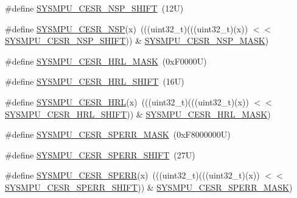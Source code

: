 \begin{DoxyCompactItemize}
\#define \mbox{\hyperlink{group___s_y_s_m_p_u___register___masks_ga1579b603c3fe8c7c00502b776915dd52}{S\+Y\+S\+M\+P\+U\+\_\+\+C\+E\+S\+R\+\_\+\+N\+S\+P\+\_\+\+S\+H\+I\+FT}}~(12\+U)
\item 
\#define \mbox{\hyperlink{group___s_y_s_m_p_u___register___masks_ga376ec3fe851f0d8e69076e1a39fddc59}{S\+Y\+S\+M\+P\+U\+\_\+\+C\+E\+S\+R\+\_\+\+N\+SP}}(x)~(((uint32\+\_\+t)(((uint32\+\_\+t)(x)) $<$$<$ \mbox{\hyperlink{group___s_y_s_m_p_u___register___masks_ga1579b603c3fe8c7c00502b776915dd52}{S\+Y\+S\+M\+P\+U\+\_\+\+C\+E\+S\+R\+\_\+\+N\+S\+P\+\_\+\+S\+H\+I\+FT}})) \& \mbox{\hyperlink{group___s_y_s_m_p_u___register___masks_gac48f7411bae4206428ca7a27f95fe89b}{S\+Y\+S\+M\+P\+U\+\_\+\+C\+E\+S\+R\+\_\+\+N\+S\+P\+\_\+\+M\+A\+SK}})
\item 
\#define \mbox{\hyperlink{group___s_y_s_m_p_u___register___masks_ga82af5460e500bd2c3b09cb1cfbbaf5d2}{S\+Y\+S\+M\+P\+U\+\_\+\+C\+E\+S\+R\+\_\+\+H\+R\+L\+\_\+\+M\+A\+SK}}~(0x\+F0000\+U)
\item 
\#define \mbox{\hyperlink{group___s_y_s_m_p_u___register___masks_gaa8920ae89621efc52d62e09f48a6bee2}{S\+Y\+S\+M\+P\+U\+\_\+\+C\+E\+S\+R\+\_\+\+H\+R\+L\+\_\+\+S\+H\+I\+FT}}~(16\+U)
\item 
\#define \mbox{\hyperlink{group___s_y_s_m_p_u___register___masks_gadf21368f19053fcc61a478ce1b0770ff}{S\+Y\+S\+M\+P\+U\+\_\+\+C\+E\+S\+R\+\_\+\+H\+RL}}(x)~(((uint32\+\_\+t)(((uint32\+\_\+t)(x)) $<$$<$ \mbox{\hyperlink{group___s_y_s_m_p_u___register___masks_gaa8920ae89621efc52d62e09f48a6bee2}{S\+Y\+S\+M\+P\+U\+\_\+\+C\+E\+S\+R\+\_\+\+H\+R\+L\+\_\+\+S\+H\+I\+FT}})) \& \mbox{\hyperlink{group___s_y_s_m_p_u___register___masks_ga82af5460e500bd2c3b09cb1cfbbaf5d2}{S\+Y\+S\+M\+P\+U\+\_\+\+C\+E\+S\+R\+\_\+\+H\+R\+L\+\_\+\+M\+A\+SK}})
\item 
\#define \mbox{\hyperlink{group___s_y_s_m_p_u___register___masks_ga4cd877b663e87af1218b6472d62f54dd}{S\+Y\+S\+M\+P\+U\+\_\+\+C\+E\+S\+R\+\_\+\+S\+P\+E\+R\+R\+\_\+\+M\+A\+SK}}~(0x\+F8000000\+U)
\item 
\#define \mbox{\hyperlink{group___s_y_s_m_p_u___register___masks_gabb82a54c803804ffe6769a1a1ba60083}{S\+Y\+S\+M\+P\+U\+\_\+\+C\+E\+S\+R\+\_\+\+S\+P\+E\+R\+R\+\_\+\+S\+H\+I\+FT}}~(27\+U)
\item 
\#define \mbox{\hyperlink{group___s_y_s_m_p_u___register___masks_ga97c01c0704a88bf1410842132456c971}{S\+Y\+S\+M\+P\+U\+\_\+\+C\+E\+S\+R\+\_\+\+S\+P\+E\+RR}}(x)~(((uint32\+\_\+t)(((uint32\+\_\+t)(x)) $<$$<$ \mbox{\hyperlink{group___s_y_s_m_p_u___register___masks_gabb82a54c803804ffe6769a1a1ba60083}{S\+Y\+S\+M\+P\+U\+\_\+\+C\+E\+S\+R\+\_\+\+S\+P\+E\+R\+R\+\_\+\+S\+H\+I\+FT}})) \& \mbox{\hyperlink{group___s_y_s_m_p_u___register___masks_ga4cd877b663e87af1218b6472d62f54dd}{S\+Y\+S\+M\+P\+U\+\_\+\+C\+E\+S\+R\+\_\+\+S\+P\+E\+R\+R\+\_\+\+M\+A\+SK}})
\end{DoxyCompactItemize}
